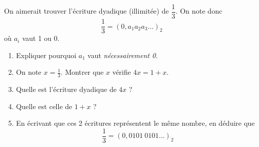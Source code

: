 \begin{exercice}[**]
	On aimerait trouver l'écriture dyadique (illimitée) de $\dfrac{1}{3}$.
	On note donc $$\dfrac{1}{3}=(0,a_1a_2a_3\ldots)_2$$
	où $a_i$ vaut 1 ou 0.
	\begin{enumerate}
		\item 	Expliquer pourquoi $a_1$ vaut \textit{nécessairement 0}.
		\item 	On note $x=\frac{1}{3}$. Montrer que $x$ vérifie $4x=1+x$.
		\item 	Quelle est l'écriture dyadique de $4x$ ?
		\item 	Quelle est celle de $1+x$ ?
		\item 	En écrivant que ces 2 écritures représentent le même nombre, en déduire que $$\dfrac{1}{3}=(0,0101\ 0101\ldots )_2$$
	\end{enumerate}
\end{exercice}


